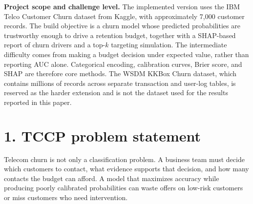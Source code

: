 \documentclass[9pt]{article}
\begin{document}
\begin{abstract}
Churn prediction becomes valuable only when it supports a safe and explainable decision. TCCP is an end-to-end system that turns the IBM Telco Customer Churn dataset into calibrated customer-risk estimates, interpretable drivers, and a ranked retention action list. The system cleans the source data, compares five classifiers, selects an RBF support-vector classifier (SVC) using validation PR-AUC, evaluates discrimination and calibration on a held-out test set, and converts risk into expected net value under a contact budget. The final model achieved test ROC-AUC $=0.846$, PR-AUC $=0.667$, and Brier score $=0.137$. The implementation also packages feature contracts, batch scoring, model registry stages, an API, and CI/CD controls so that a prediction can be traced from input data to production action.
\end{abstract}


\textbf{Project scope and challenge level.} The implemented version uses the IBM Telco Customer Churn dataset from Kaggle, with approximately 7,000 customer records. The build objective is a churn model whose predicted probabilities are trustworthy enough to drive a retention budget, together with a SHAP-based report of churn drivers and a top-$k$ targeting simulation. The intermediate difficulty comes from making a budget decision under expected value, rather than reporting AUC alone. Categorical encoding, calibration curves, Brier score, and SHAP are therefore core methods. The WSDM KKBox Churn dataset, which contains millions of records across separate transaction and user-log tables, is reserved as the harder extension and is not the dataset used for the results reported in this paper.

\section*{1. TCCP problem statement}
Telecom churn is not only a classification problem. A business team must decide which customers to contact, what evidence supports that decision, and how many contacts the budget can afford. A model that maximizes accuracy while producing poorly calibrated probabilities can waste offers on low-risk customers or miss customers who need intervention.
\end{document}
